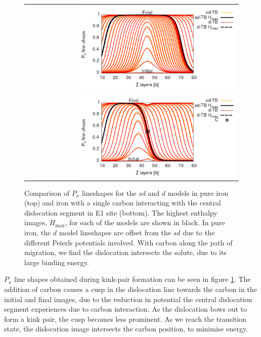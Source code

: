 \documentclass[a4paper,11pt]{article}
\begin{document}
    \begin{figure}
\centering
	\begin{tabular}{r}
		      \includegraphics[width=0.75\textwidth]{Images/lineshape_no_carbon_sd_dTB_off_kilter_hmax_label.png} \\
		      \includegraphics[width=0.75\textwidth]{Images/lineshape_with_carbon_sd_dTB_off_kilter_hmax_label.png}  \\

		 \end{tabular}
    \caption{ Comparison of $P_x$ lineshapes for the $sd$ and $d$ models in pure iron (top) and iron with a single carbon interacting with the central dislocation segment in E1 site (bottom). The highest enthalpy images, $H_{\text{max}}$, for each of the models are shown in black. In pure iron, the $d$ model lineshapes are offset from the $sd$ due to the different Peierls potentials involved. With carbon along the path of migration, we find the dislocation intersects the solute, due to its large binding energy.}
    \label{fig:alllineshapes}
       \end{figure}


\(P_x\) line shapes obtained during kink-pair formation can be seen in figure
\ref{fig:alllineshapes}. The addition of carbon causes a cusp in the
dislocation line towards the carbon in the initial and final images, due to
the reduction in potential the central dislocation segment experiences due
to carbon interaction. As the dislocation bows out to form a kink pair, the
cusp becomes less prominent. As we reach the transition state, the dislocation
image intersects the carbon position, to minimise energy.
\end{document}
